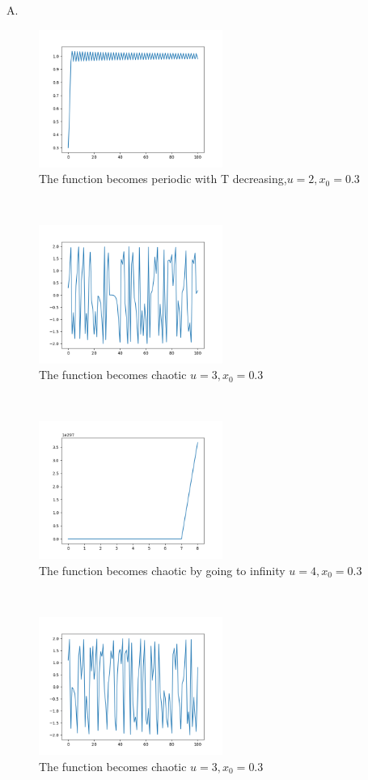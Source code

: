 \documentclass{article}
\begin{document}
A.\\
\begin{figure}[htp]
    \centering
    \includegraphics[width=6cm]{photos/1.png}
    \caption{The function becomes periodic with T decreasing,$u=2,x_0=0.3$}
    \label{fig:1}
\end{figure}
\\
\begin{figure}[htp]
    \centering
    \includegraphics[width=6cm]{photos/2.png}
    \caption{The function becomes chaotic $u=3,x_0=0.3$}
    \label{fig:2}
\end{figure}
\\
\begin{figure}[htp]
    \centering
    \includegraphics[width=6cm]{photos/3.png}
    \caption{The function becomes chaotic by going to infinity $u=4,x_0=0.3$}
    \label{fig:3}
\end{figure}
\\
\begin{figure}[htp]
    \centering
    \includegraphics[width=6cm]{photos/1b.png}
    \caption{The function becomes chaotic $u=3,x_0=0.3$}
    \label{fig:1b}
\end{figure}
\end{document}
